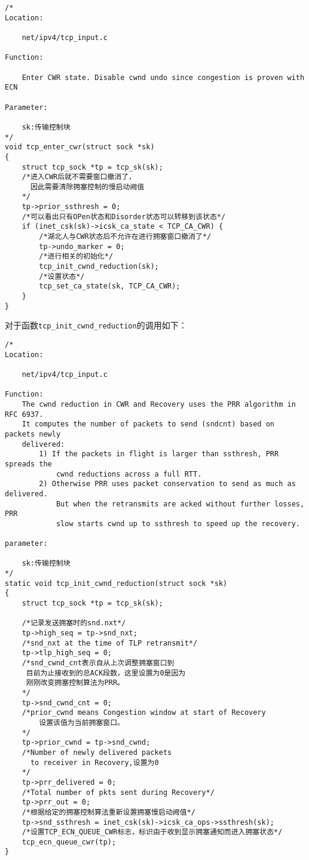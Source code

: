 \begin{verbatim}
/* 
Location:

	net/ipv4/tcp_input.c

Function:

	Enter CWR state. Disable cwnd undo since congestion is proven with ECN 

Parameter:

	sk:传输控制块
*/
void tcp_enter_cwr(struct sock *sk)
{
	struct tcp_sock *tp = tcp_sk(sk);
	/*进入CWR后就不需要窗口撤消了，
      因此需要清除拥塞控制的慢启动阙值
	*/
	tp->prior_ssthresh = 0;
	/*可以看出只有OPen状态和Disorder状态可以转移到该状态*/
	if (inet_csk(sk)->icsk_ca_state < TCP_CA_CWR) {
		/*湖北人与CWR状态后不允许在进行拥塞窗口撤消了*/		
		tp->undo_marker = 0;
		/*进行相关的初始化*/
		tcp_init_cwnd_reduction(sk);
		/*设置状态*/		
		tcp_set_ca_state(sk, TCP_CA_CWR);
	}
}
\end{verbatim}

		对于函数\texttt{tcp_init_cwnd_reduction}的调用如下：
\begin{verbatim}
/*
Location:

	net/ipv4/tcp_input.c

Function:
	The cwnd reduction in CWR and Recovery uses the PRR algorithm in RFC 6937.
	It computes the number of packets to send (sndcnt) based on packets newly
	delivered:
		1) If the packets in flight is larger than ssthresh, PRR spreads the
			cwnd reductions across a full RTT.
		2) Otherwise PRR uses packet conservation to send as much as delivered.
			But when the retransmits are acked without further losses, PRR
			slow starts cwnd up to ssthresh to speed up the recovery.

parameter:

	sk:传输控制块
*/
static void tcp_init_cwnd_reduction(struct sock *sk)
{
	struct tcp_sock *tp = tcp_sk(sk);

	/*记录发送拥塞时的snd.nxt*/
	tp->high_seq = tp->snd_nxt;
	/*snd_nxt at the time of TLP retransmit*/
	tp->tlp_high_seq = 0;
	/*snd_cwnd_cnt表示自从上次调整拥塞窗口到
	 目前为止接收到的总ACK段数，这里设置为0是因为
	 刚刚改变拥塞控制算法为PRR。
	*/
	tp->snd_cwnd_cnt = 0;
	/*prior_cwnd means Congestion window at start of Recovery
		设置该值为当前拥塞窗口。
	*/
	tp->prior_cwnd = tp->snd_cwnd;
	/*Number of newly delivered packets
	  to receiver in Recovery,设置为0
	*/
	tp->prr_delivered = 0;
	/*Total number of pkts sent during Recovery*/
	tp->prr_out = 0;
	/*根据给定的拥塞控制算法重新设置拥塞慢启动阙值*/
	tp->snd_ssthresh = inet_csk(sk)->icsk_ca_ops->ssthresh(sk);
	/*设置TCP_ECN_QUEUE_CWR标志，标识由于收到显示拥塞通知而进入拥塞状态*/
	tcp_ecn_queue_cwr(tp);
}
\end{verbatim}
